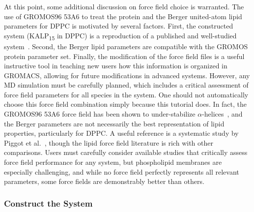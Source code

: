 \documentclass[9pt,tutorial]{livecoms}
\begin{document}
At this point, some additional discussion on force field choice is warranted. The use of GROMOS96 53A6 to treat the protein and the Berger united-atom lipid parameters for DPPC is motivated by several factors. First, the constructed system (KALP\textsubscript{15} in DPPC) is a reproduction of a published and well-studied system~\cite{Kandasamy2006}. Second, the Berger lipid parameters are compatible with the GROMOS protein parameter set. Finally, the modification of the force field files is a useful instructive tool in teaching new users how this information is organized in GROMACS, allowing for future modifications in advanced systems. However, any MD simulation must be carefully planned, which includes a critical assessment of force field parameters for all species in the system. One should not automatically choose this force field combination simply because this tutorial does. In fact, the GROMOS96 53A6 force field has been shown to under-stabilize $\alpha$-helices~\cite{Schmid2011}, and the Berger parameters are not necessarily the best representation of lipid properties, particularly for DPPC. A useful reference is a systematic study by Piggot et al.~\cite{Piggot2012}, though the lipid force field literature is rich with other comparisons. Users must carefully consider available studies that critically assess force field performance for any system, but phospholipid membranes are especially challenging, and while no force field perfectly represents all relevant parameters, some force fields are demonstrably better than others.

\subsubsection{Construct the System} \label{kalp_construct}
\end{document}
